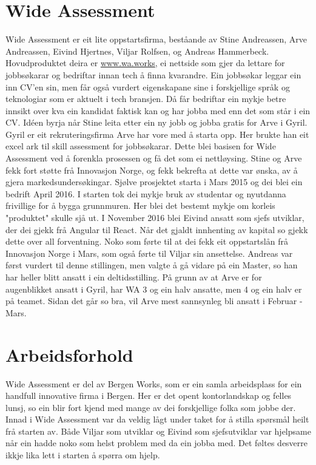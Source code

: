 \documentclass[12pt]{article}
\begin{document}
\section{Wide Assessment}

Wide Assessment er eit lite oppstartsfirma, beståande av Stine Andreassen,
Arve Andreassen, Eivind Hjertnes, Viljar Rolfsen, og Andreas Hammerbeck.
Hovudproduktet deira er \url{www.wa.works}, ei nettside som gjer da lettare for
jobbsøkarar og bedriftar innan tech å finna kvarandre. Ein jobbsøkar leggar ein inn CV'en
sin, men får også vurdert eigenskapane sine i forskjellige språk og teknologiar
som er aktuelt i tech bransjen. Då får bedriftar ein mykje betre innsikt over
kva ein kandidat faktisk kan og har jobba med enn det som står i ein CV.
Idéen byrja når Stine leita etter ein ny jobb og jobba gratis for Arve i Gyril.
Gyril er eit rekruteringsfirma Arve har vore med å starta opp. Her brukte han
eit excel ark til skill assessment for jobbsøkarar. Dette blei basisen for Wide
Assessment ved å forenkla prosessen og få det som ei nettløysing. Stine og Arve
fekk fort støtte frå Innovasjon Norge, og fekk bekrefta at dette var ønska, av å
gjera markedsundersøkingar. Sjølve prosjektet starta i Mars 2015 og dei blei ein
bedrift April 2016. I starten tok dei mykje bruk av studentar og nyutdanna frivillige
for å bygga grunnmuren. Her blei det bestemt mykje om korleis "produktet" skulle
sjå ut. I November 2016 blei Eivind ansatt som sjefs utviklar, der dei gjekk frå
Angular til React. Når det gjaldt innhenting av kapital so gjekk dette over all
forventning. Noko som førte til at dei fekk eit oppstartslån frå Innovasjon Norge
i Mars, som også førte til Viljar sin ansettelse. Andreas var først vurdert til
denne stillingen, men valgte å gå vidare på ein Master, so han har heller blitt
ansatt i ein deltidsstilling. På grunn av at Arve er for augenblikket ansatt i
Gyril, har WA 3 og ein halv ansatte, men 4 og ein halv er på teamet. Sidan det går so
bra, vil Arve mest sannsynleg bli ansatt i Februar - Mars.

\section{Arbeidsforhold}

Wide Assessment er del av Bergen Works, som er ein samla arbeidsplass for ein
handfull innovative firma i Bergen. Her er det opent kontorlandskap og felles
lunsj, so ein blir fort kjend med mange av dei forskjellige folka som jobbe der.
Innad i Wide Assessment var da veldig lågt under taket for å stilla spørsmål heilt
frå starten av. Både Viljar som utviklar og Eivind som sjefsutviklar var hjelpsame
når ein hadde noko som helst problem med da ein jobba med. Det føltes desverre ikkje
lika lett i starten å spørra om hjelp.
\end{document}

